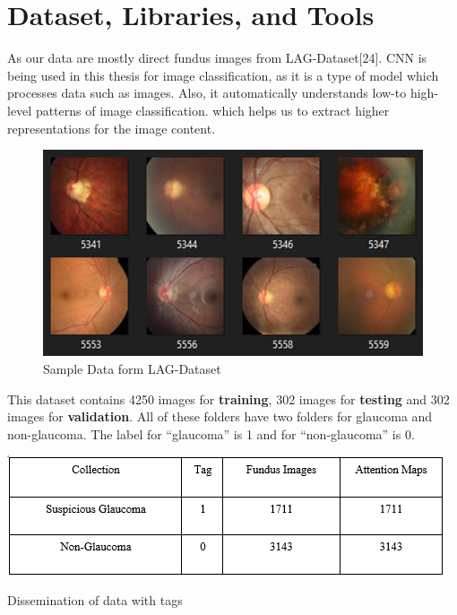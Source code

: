 \section{Dataset, Libraries, and Tools}
As our data are mostly direct fundus images from LAG-Dataset[24]. CNN is being used in this thesis for image classification, as it is a type of model which processes data such as images. Also, it automatically understands low-to high-level patterns of image classification. which helps us to extract higher representations for the image content.

\vspace{5mm}
\begin{figure}[htbp]
\centering
\includegraphics[scale=1]{images/fig-5.png}
\caption{Sample Data form LAG-Dataset}
\label{fig:x Sample Data form LAG-Dataset}
\end{figure}

\noindent This dataset contains 4250 images for \textbf{training}, 302 images for \textbf{testing} and 302 images for \textbf{validation}. All of these folders have two folders for glaucoma and non-glaucoma. The label for “glaucoma” is 1 and for “non-glaucoma” is 0.

\vspace{5mm}
\begin{table}[htbp]
\centering
\includegraphics[scale=1]{images/fig_6.png}
\caption{\label{tab:Dissemination of data with tags}Dissemination of data with tags}

\end{table}

